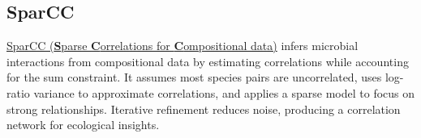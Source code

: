\documentclass[
]{article}
\newenvironment{Shaded}{\begin{snugshade}}{\end{snugshade}}
\newcommand{\AttributeTok}[1]{\textcolor[rgb]{0.13,0.29,0.53}{#1}}
\newcommand{\CommentTok}[1]{\textcolor[rgb]{0.56,0.35,0.01}{\textit{#1}}}
\newcommand{\DecValTok}[1]{\textcolor[rgb]{0.00,0.00,0.81}{#1}}
\newcommand{\FloatTok}[1]{\textcolor[rgb]{0.00,0.00,0.81}{#1}}
\newcommand{\FunctionTok}[1]{\textcolor[rgb]{0.13,0.29,0.53}{\textbf{#1}}}
\newcommand{\NormalTok}[1]{#1}
\newcommand{\OtherTok}[1]{\textcolor[rgb]{0.56,0.35,0.01}{#1}}
\newcommand{\SpecialCharTok}[1]{\textcolor[rgb]{0.81,0.36,0.00}{\textbf{#1}}}
\begin{document}
\hypertarget{sparcc}{%
\subsection{SparCC}\label{sparcc}}

\href{https://journals.plos.org/ploscompbiol/article?id=10.1371/journal.pcbi.1002687}{SparCC
(\textbf{S}parse \textbf{C}orrelations for \textbf{C}ompositional data)}
infers microbial interactions from compositional data by estimating
correlations while accounting for the sum constraint. It assumes most
species pairs are uncorrelated, uses log-ratio variance to approximate
correlations, and applies a sparse model to focus on strong
relationships. Iterative refinement reduces noise, producing a
correlation network for ecological insights.

\begin{Shaded}
\end{Shaded}
\end{document}
